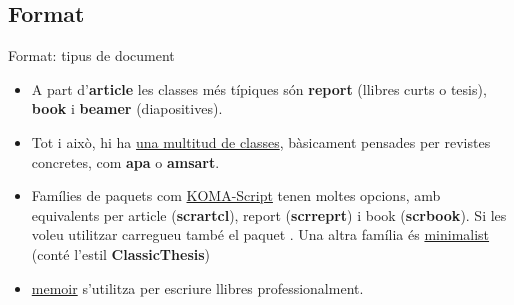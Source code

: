 \subsection{Format}
\begin{frame}[fragile]{Format: tipus de document}
\begin{itemize}
\item A part d'\textbf{article} les classes més típiques són \textbf{report} (llibres curts o tesis), \textbf{book} i \textbf{beamer} (diapositives).
\item Tot i això, hi ha \href{https://ctan.org/topic/class}{una multitud de classes}, bàsicament pensades per revistes concretes, com \textbf{apa} o \textbf{amsart}.
\item Famílies de paquets com \href{https://ctan.org/pkg/koma-script}{KOMA-Script} tenen moltes opcions, amb equivalents per article (\textbf{scrartcl}), report (\textbf{scrreprt}) i book (\textbf{scrbook}). Si les voleu utilitzar carregueu també el paquet . Una altra família és \href{https://ctan.org/pkg/minimalist}{minimalist} (conté l'estil \textbf{ClassicThesis})
\item \href{https://ctan.org/pkg/memoir}{memoir} s'utilitza per escriure llibres professionalment.
\end{itemize}


\end{frame}


